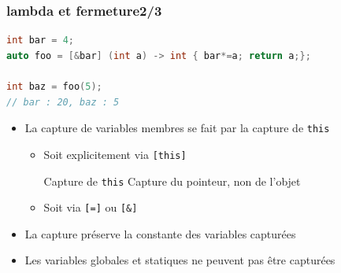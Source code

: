 \documentclass[C++.tex]{subfiles}
\begin{document}
\begin{frame}[fragile]
	\frametitle{lambda et fermeture\titlehfill{}2/3}
	\begin{lstlisting}[language=C++]
int bar = 4;
auto foo = [&bar] (int a) -> int { bar*=a; return a;};

int baz = foo(5);
// bar : 20, baz : 5\end{lstlisting}

	\begin{itemize}
		\item La capture de variables membres se fait par la capture de  \lstinline|this|

		\begin{itemize}
			\item Soit explicitement via \lstinline|[this]|

			\begin{alertblock}{Capture de \lstinline|this|}
				Capture du pointeur, non de l'objet
	
			\end{alertblock}
			
			\item Soit via \lstinline|[=]| ou \lstinline|[&]|


		\end{itemize}
		\item La capture préserve la constante des variables capturées


		\item Les variables globales et statiques ne peuvent pas être capturées

	\end{itemize}
\end{frame}
\end{document}
